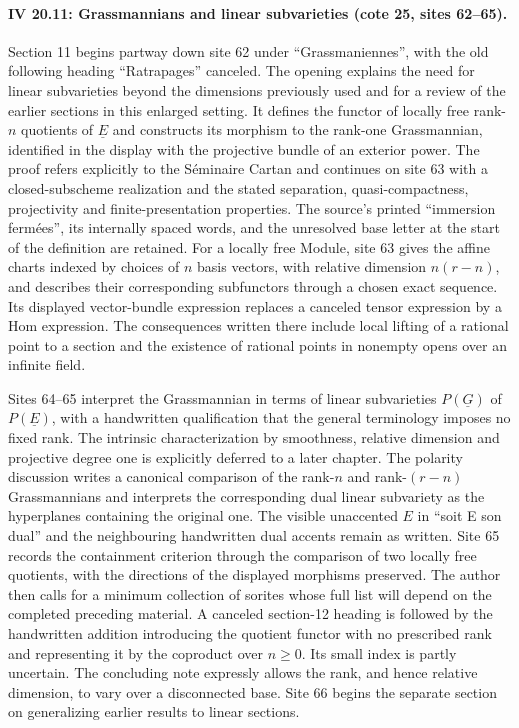 \documentclass[10pt,a4paper]{article}
\begin{document}
\paragraph{IV 20.11: Grassmannians and linear subvarieties (cote 25, sites 62--65).}
Section 11 begins partway down site 62 under ``Grassmaniennes'', with the old following heading ``Ratrapages'' canceled. The opening explains the need for linear subvarieties beyond the dimensions previously used and for a review of the earlier sections in this enlarged setting. It defines the functor of locally free rank-$n$ quotients of $\underline E$ and constructs its morphism to the rank-one Grassmannian, identified in the display with the projective bundle of an exterior power. The proof refers explicitly to the S\'eminaire Cartan and continues on site 63 with a closed-subscheme realization and the stated separation, quasi-compactness, projectivity and finite-presentation properties. The source's printed ``immersion ferm\'ees'', its internally spaced words, and the unresolved base letter at the start of the definition are retained. For a locally free Module, site 63 gives the affine charts indexed by choices of $n$ basis vectors, with relative dimension $n(r-n)$, and describes their corresponding subfunctors through a chosen exact sequence. Its displayed vector-bundle expression replaces a canceled tensor expression by a Hom expression. The consequences written there include local lifting of a rational point to a section and the existence of rational points in nonempty opens over an infinite field.

Sites 64--65 interpret the Grassmannian in terms of linear subvarieties $P(\underline G)$ of $P(\underline E)$, with a handwritten qualification that the general terminology imposes no fixed rank. The intrinsic characterization by smoothness, relative dimension and projective degree one is explicitly deferred to a later chapter. The polarity discussion writes a canonical comparison of the rank-$n$ and rank-$(r-n)$ Grassmannians and interprets the corresponding dual linear subvariety as the hyperplanes containing the original one. The visible unaccented $E$ in ``soit E son dual'' and the neighbouring handwritten dual accents remain as written. Site 65 records the containment criterion through the comparison of two locally free quotients, with the directions of the displayed morphisms preserved. The author then calls for a minimum collection of sorites whose full list will depend on the completed preceding material. A canceled section-12 heading is followed by the handwritten addition introducing the quotient functor with no prescribed rank and representing it by the coproduct over $n\geq0$. Its small index is partly uncertain. The concluding note expressly allows the rank, and hence relative dimension, to vary over a disconnected base. Site 66 begins the separate section on generalizing earlier results to linear sections.
\par{}
\end{document}
